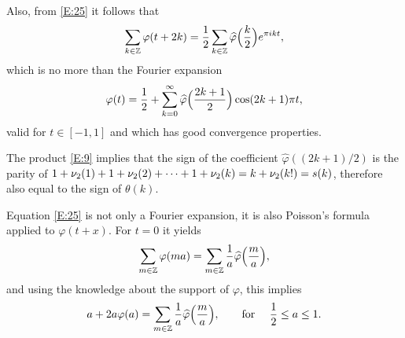 \documentclass[10pt]{amsart}
\theoremstyle{definition}
\theoremstyle{remark}
\begin{document}
Also, from \eqref{E:25} it follows that
\begin{equation}\label{E:29}
\sum_{k\in\mathbb{Z}}\varphi(t+2k)=\frac12\sum_{k\in\mathbb{Z}}
\widehat\varphi\Bigl(\frac{k}{2}\Bigr)e^{\pi i k t},
\end{equation}
which  is no more than the Fourier expansion
\begin{equation}\label{E:30}
\varphi(t)=\frac12+\sum_{k=0}^\infty \widehat\varphi\Bigl(\frac{2k+1}{2}\Bigr)
\cos(2k+1)\pi t,
\end{equation}
valid for $t\in[-1,1]$ and which has good convergence properties.

The product \eqref{E:9} implies that the sign of the coefficient $\widehat\varphi((2k+1)/2)$
is the parity of
$1+\nu_{2}(1)+1+\nu_{2}(2)+\cdots
+1+\nu_{2}(k)=k+\nu_{2}(k!)=s(k)$, therefore also equal
to the sign of $\theta(k)$.

Equation \eqref{E:25} is not only a Fourier expansion, it is also Poisson's formula applied 
to $\varphi(t+x)$. For $t=0$ it yields
\begin{equation}\label{E:31}
\sum_{m\in\mathbb{Z}}\varphi(ma)=\sum_{m\in\mathbb{Z}}\frac{1}{a}\widehat\varphi\Bigl(\frac{m}{a}\Bigr),
\end{equation}
and using the knowledge about the support of $\varphi$, this implies
\begin{equation}\label{E:32}
a+2a\varphi(a)=\sum_{m\in\mathbb{Z}}\frac{1}{a}\widehat\varphi\Bigl(\frac{m}{a}\Bigr),
\qquad \text{for }\quad\frac12\le a\le 1.
\end{equation}
\end{document}
